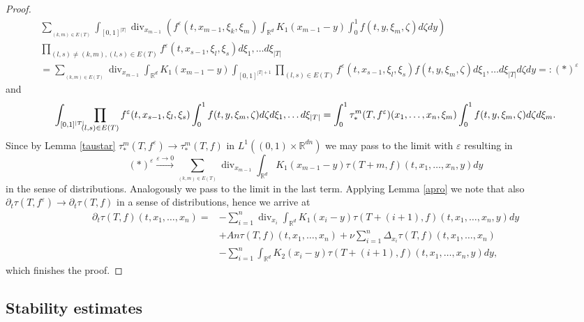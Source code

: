 \documentclass[10pt]{article}
\def\divv{\operatorname {div}}
\newcommand{\ve}{\varepsilon}
\newcommand{\R}{\mathbb{R}}
\newcommand{\izj}{\int_{0}^{1}}
\newcommand{\ird}{\int_{\mathbb{R}^d}}
\begin{document}
\begin{proof}
\begin{align*}
 &\sum_{_{(k,m)\in E(T)}}\int_{[0,1]^{|T|}}\divv_{x_{m-1}} \left( f^\ve(t,x_{m-1},\xi_k,\xi_{m}) \ird K_{1}(x_{m-1}-y)\izj f(t,y,\xi_{m},\zeta) d\zeta dy\right) \\
&\prod _{(l,s)\neq (k,m), (l,s) \in E(T)} f^\ve(t,x_{s-1},\xi_l,\xi_{s}) d\xi_1,\dots d \xi_{|T|}\\
&=\sum_{_{(k,m)\in E(T)}}\divv_{x_{m-1}}\ird K_{1}(x_{m-1}-y)\int_{[0,1]^{|T|+1}}\prod _{ (l,s)\in E(T)}f^\ve(t,x_{s-1},\xi_l,\xi_{s})f(t,y,\xi_{m},\zeta)d\xi_1,\dots d \xi_{|T|} d\zeta dy=:(*)^\ve
\end{align*}
and 
\[
\int_{[0,1]^{|T|}}\hspace{-0.2cm}\prod _{ (l,s)\in E(T)}f^\ve(t,x_{s-1},\xi_l,\xi_{s})\izj f(t,y,\xi_{m},\zeta)d\zeta d\xi_1,\dots d \xi_{|T|} 
=\izj \tau_{*}^m(T,f^{\ve})(x_1,\dots,x_n,\xi_m) \izj f(t,y,\xi_{m},\zeta)d\zeta d\xi_m.
\]
Since by Lemma \ref{taustar} $\tau_{*}^m(T,f^{\ve}) \rightarrow \tau_{*}^m(T,f)$ in $L^{1}((0,1)\times \R^{dn})$ we may pass to the limit with $\ve$ resulting in 
\[
(*)^\ve \overset{\ve\rightarrow 0}{\longrightarrow }\sum_{_{(k,m)\in E(T)}}\divv_{x_{m-1}}\ird K_{1}(x_{m-1}-y) \tau(T+m,f)(t,x_1,\dots,x_n,y)dy
\]
in the sense of distributions. Analogously we pass to the limit in the last term. Applying Lemma \ref{apro} we note that also $\partial_t\tau(T,f^\ve)\rightarrow \partial_t\tau(T,f)$ in a sense of distributions, hence we arrive at
\begin{align*}
    \partial_t \tau(T,f)(t,x_1,\dots,x_n)=&-\sum_{i=1}^n \divv_{x_i}\ird K_{1}(x_{i}-y) \tau(T+(i+1),f)(t,x_1,\dots,x_n,y)dy\\
    &+ An\tau(T,f)(t,x_1,\dots,x_n) + \nu \sum_{i=1}^n\Delta_{x_i} \tau(T,f)(t,x_1,\dots,x_n)\\
    &-\sum_{i=1}^n \ird K_{2}(x_{i}-y) \tau(T+(i+1),f)(t,x_1,\dots,x_n,y)dy,
\end{align*}
which finishes the proof.
\end{proof}

\subsection{Stability estimates}
\end{document}
